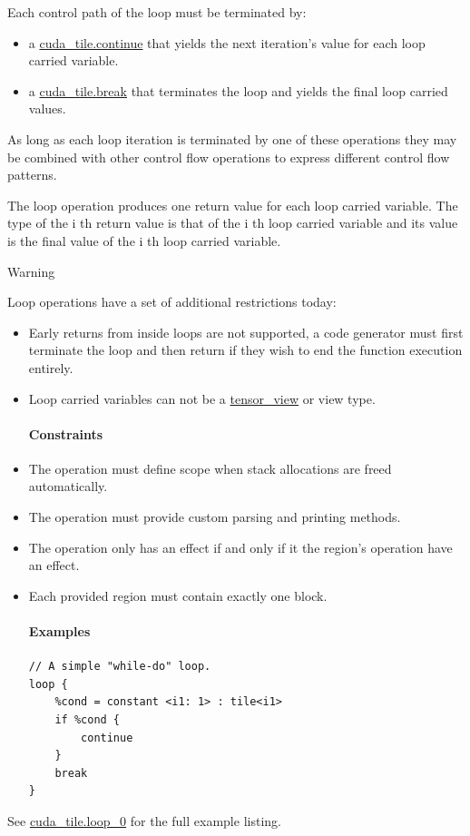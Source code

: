 \documentclass{article}
\begin{document}
Each control path of the loop must be terminated by:


\begin{itemize}
\item a \href{https://docs.nvidia.com/cuda/tile-ir/latest/sections/operations.html#op-cuda-tile-continue}{cuda\_tile.continue} that yields the next iteration's value for each loop carried variable.
\item a \href{https://docs.nvidia.com/cuda/tile-ir/latest/sections/operations.html#op-cuda-tile-break}{cuda\_tile.break} that terminates the loop and yields the final loop carried values.

\end{itemize}
As long as each loop iteration is terminated by one of these operations they may be combined with other control flow operations to express different control flow patterns.


The loop operation produces one return value for each loop carried variable. The type of the i th return value is that of the i th loop carried variable and its value is the final value of the i th loop carried variable.


Warning


Loop operations have a set of additional restrictions today:


\begin{itemize}
\item Early returns from inside loops are not supported, a code generator must first terminate the loop and then return if they wish to end the function execution entirely.
\item Loop carried variables can not be a \href{https://docs.nvidia.com/cuda/tile-ir/latest/sections/types.html#type-tensor-view}{tensor\_view} or view type.


\paragraph{Constraints}

\item The operation must define scope when stack allocations are freed automatically.
\item The operation must provide custom parsing and printing methods.
\item The operation only has an effect if and only if it the region's operation have an effect.
\item Each provided region must contain exactly one block.


\paragraph{Examples}

\begin{lstlisting}
// A simple "while-do" loop.
loop {
    %cond = constant <i1: 1> : tile<i1>
    if %cond {
        continue
    }
    break
}
\end{lstlisting}

\end{itemize}
See \href{https://docs.nvidia.com/cuda/tile-ir/latest/sections/appendix.html#example-cuda-tile-loop-0}{cuda\_tile.loop\_0} for the full example listing.
\end{document}
